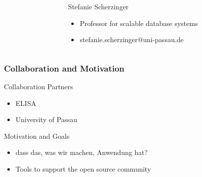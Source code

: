 \documentclass{beamer}
\begin{document}
\begin{frame}
\begin{minipage}[c]{1.0\linewidth}
\begin{columns}
\begin{column}{0.35\textwidth}
\begin{center}
			\end{center}
		\end{column}
		\begin{column}{0.7\textwidth}
		\begin{block}{Stefanie Scherzinger}
			\begin{itemize}
				\item Professor for scalable database systems
				\item stefanie.scherzinger@uni-passau.de
			\end{itemize}
		\end{block}
		\end{column}
		\end{columns}
	\end{minipage}
	\end{frame}


	\begin{frame}
	\frametitle{Collaboration and Motivation}
		\begin{block}{Collaboration Partners}
			\begin{itemize}
				\item ELISA
				\item University of Passau
			\end{itemize}
		\end{block}
		\begin{block}{Motivation and Goals}
			\begin{itemize}
				\item dass das, was wir machen, Anwendung hat?
				\item Tools to support the open source community
			\end{itemize}
		\end{block}
	\end{frame}
\end{document}
